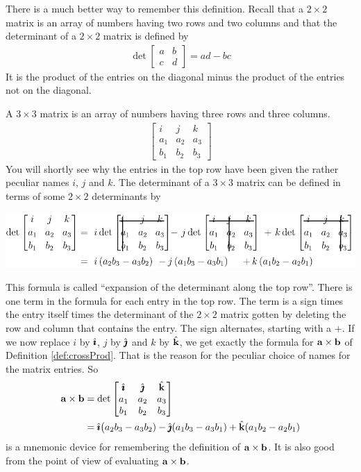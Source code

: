 There is a much better way to remember this definition. Recall that
a $2\times 2$ matrix is an array of numbers having two rows and two columns
and that the determinant of a $2\times 2$ matrix is  defined by
\begin{align*}
\det \left[\begin{matrix}a& b\\ c&d\end{matrix}\right]=ad-bc
\end{align*}
It is the product of the entries on the diagonal minus the product
of the entries not on the diagonal. 

A $3\times 3$ matrix is an array of
numbers having three rows and three columns.
\begin{align*}
 \left[\begin{matrix}i& j &k\\ a_1&a_2&a_3\\ b_1&b_2&b_3\end{matrix}\right]
\end{align*}
You will shortly see why the entries in the top row have been given the
rather peculiar names $i$, $j$ and $k$. The determinant of a $3\times 3$ 
matrix can be defined in terms of some $2\times 2$ determinants by
      \begin{center}
      \includegraphics{det.pdf}
      \end{center}
This formula is called ``expansion of the determinant along the top row''. 
There is one term in the formula for each entry in the top row. The term is
a sign times the entry itself times the determinant of the $2\times 2$ matrix
gotten by deleting the row and column that contains the entry. The sign
alternates, starting with a $+$. If we now replace $i$ by $\hat{\pmb{\imath}}$, $j$ by $\hat{\pmb{\jmath}}$ 
and $k$ by $\hat{\mathbf{k}}$, we get exactly the formula for $\mathbf{a}\times \mathbf{b}$
of Definition \ref{def:crossProd}. That is the reason for the peculiar 
choice of names for the matrix entries. So
\begin{align*}
\mathbf{a}\times\mathbf{b}
&=\det\left[\begin{matrix}\hat{\pmb{\imath}}& \hat{\pmb{\jmath}} &\hat{\mathbf{k}}\\ 
                            a_1&a_2&a_3\\ 
                            b_1&b_2&b_3\end{matrix}\right] \\
&=\hat{\pmb{\imath}}\big(a_2b_3-a_3b_2) -\hat{\pmb{\jmath}}(a_1b_3-a_3b_1) +\hat{\mathbf{k}}(a_1b_2-a_2b_1)
\end{align*}
is a mnemonic device for remembering the definition of $\mathbf{a}\times\mathbf{b}$.
It is also good from the point of view of 
evaluating $\mathbf{a}\times\mathbf{b}$.

